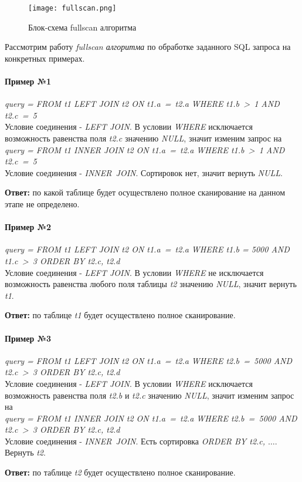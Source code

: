 \begin{figure}[h]
  \centering
  \texttt{[image: fullscan.png]}
  \caption{Блок-схема fullscan алгоритма}
  \label{img:fullscan}
\end{figure}


Рассмотрим работу \textit{fullscan алгоритма} по обработке заданного SQL запроса на конкретных  примерах.

\paragraph{Пример №1}

\textit{query = FROM t1 LEFT JOIN t2 ON t1.a~=~t2.a WHERE t1.b~>~1 AND t2.c~=~5}\\
Условие соединения - \textit{LEFT JOIN}. В условии \textit{WHERE} исключается возможность равенства поля \textit{t2.c} значению \textit{NULL}, значит изменим запрос на\\
\textit{query = FROM t1 INNER JOIN t2 ON t1.a~=~t2.a WHERE t1.b~>~1 AND t2.c~=~5}\\
Условие соединения - \textit{INNER JOIN}. Сортировок нет, значит вернуть \textit{NULL}. 

\textbf{Ответ:} по какой таблице будет осуществлено полное сканирование на данном этапе не определено.


\paragraph{Пример №2}

\textit{query = FROM t1 LEFT JOIN t2  ON t1.a~=~t2.a WHERE t1.b = 5000 AND t1.c~>~3 ORDER BY t2.c, t2.d}\\
Условие соединения - \textit{LEFT JOIN}. В условии \textit{WHERE} не исключается возможность равенства любого поля таблицы \textit{t2} значению \textit{NULL}, значит вернуть \textit{t1}.

\textbf{Ответ:} по таблице \textit{t1} будет осуществлено полное сканирование. 


\paragraph{Пример №3}

\textit{query = FROM t1 LEFT JOIN t2 ON t1.a~=~t2.a WHERE t2.b~=~5000 AND t2.c~>~3 ORDER BY t2.c, t2.d}\\
Условие соединения - \textit{LEFT JOIN}. В условии \textit{WHERE} исключается возможность равенства поля \textit{t2.b} и \textit{t2.c} значению \textit{NULL}, значит изменим запрос на\\
\textit{query = FROM t1 INNER JOIN t2 ON t1.a~=~t2.a WHERE t2.b~=~5000 AND t2.c~>~3 ORDER BY t2.c, t2.d}\\
Условие соединения - \textit{INNER JOIN}. Есть сортировка \textit{ORDER BY t2.c, $\ldots$}. Вернуть \textit{t2}.

\textbf{Ответ:} по таблице \textit{t2} будет осуществлено полное сканирование. 
